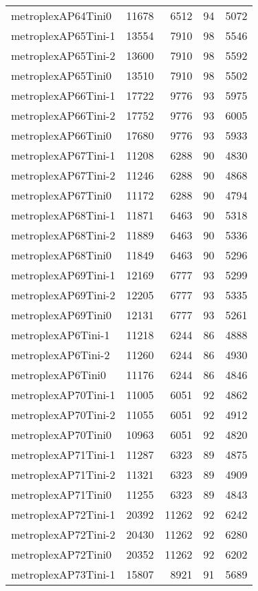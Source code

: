 \documentclass[../../../thesis.tex]{subfiles}
\begin{document}
\begin{longtable}{lrrrr}
metroplexAP64Tini0 & 11678 & 6512 & 94 & 5072 \\
metroplexAP65Tini-1 & 13554 & 7910 & 98 & 5546 \\
metroplexAP65Tini-2 & 13600 & 7910 & 98 & 5592 \\
metroplexAP65Tini0 & 13510 & 7910 & 98 & 5502 \\
metroplexAP66Tini-1 & 17722 & 9776 & 93 & 5975 \\
metroplexAP66Tini-2 & 17752 & 9776 & 93 & 6005 \\
metroplexAP66Tini0 & 17680 & 9776 & 93 & 5933 \\
metroplexAP67Tini-1 & 11208 & 6288 & 90 & 4830 \\
metroplexAP67Tini-2 & 11246 & 6288 & 90 & 4868 \\
metroplexAP67Tini0 & 11172 & 6288 & 90 & 4794 \\
metroplexAP68Tini-1 & 11871 & 6463 & 90 & 5318 \\
metroplexAP68Tini-2 & 11889 & 6463 & 90 & 5336 \\
metroplexAP68Tini0 & 11849 & 6463 & 90 & 5296 \\
metroplexAP69Tini-1 & 12169 & 6777 & 93 & 5299 \\
metroplexAP69Tini-2 & 12205 & 6777 & 93 & 5335 \\
metroplexAP69Tini0 & 12131 & 6777 & 93 & 5261 \\
metroplexAP6Tini-1 & 11218 & 6244 & 86 & 4888 \\
metroplexAP6Tini-2 & 11260 & 6244 & 86 & 4930 \\
metroplexAP6Tini0 & 11176 & 6244 & 86 & 4846 \\
metroplexAP70Tini-1 & 11005 & 6051 & 92 & 4862 \\
metroplexAP70Tini-2 & 11055 & 6051 & 92 & 4912 \\
metroplexAP70Tini0 & 10963 & 6051 & 92 & 4820 \\
metroplexAP71Tini-1 & 11287 & 6323 & 89 & 4875 \\
metroplexAP71Tini-2 & 11321 & 6323 & 89 & 4909 \\
metroplexAP71Tini0 & 11255 & 6323 & 89 & 4843 \\
metroplexAP72Tini-1 & 20392 & 11262 & 92 & 6242 \\
metroplexAP72Tini-2 & 20430 & 11262 & 92 & 6280 \\
metroplexAP72Tini0 & 20352 & 11262 & 92 & 6202 \\
metroplexAP73Tini-1 & 15807 & 8921 & 91 & 5689 \\

\end{longtable}
\end{document}
